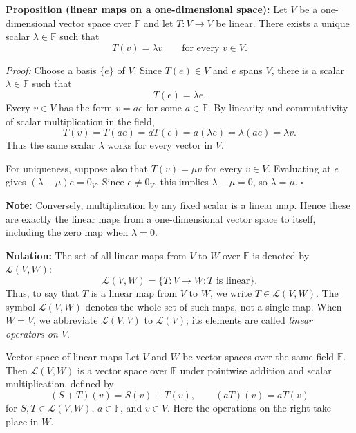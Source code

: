 \documentclass[a4paper,11pt,abstract=true]{scrartcl}
\theoremstyle{dotlessP}
\theoremstyle{dotlessS}
\theoremstyle{remark}
\theoremstyle{definition}
\begin{document}
\begin{claim_box}
\textbf{Proposition (linear maps on a one-dimensional space):} Let
$V$ be a one-dimensional vector space over $\mathbb{F}$ and let
$T:V\longrightarrow V$ be linear. There exists a unique scalar
$\lambda\in\mathbb{F}$ such that
\[
T(v)=\lambda v\qquad\text{for every }v\in V.
\]

\textit{Proof:} Choose a basis $\{e\}$ of $V$. Since $T(e)\in V$ and
$e$ spans $V$, there is a scalar $\lambda\in\mathbb{F}$ such that
\[
T(e)=\lambda e.
\]
Every $v\in V$ has the form $v=ae$ for some $a\in\mathbb{F}$.
By linearity and commutativity of scalar multiplication in the field,
\[
T(v)=T(ae)=aT(e)=a(\lambda e)=\lambda(ae)=\lambda v.
\]
Thus the same scalar $\lambda$ works for every vector in $V$.

For uniqueness, suppose also that $T(v)=\mu v$ for every $v\in V$.
Evaluating at $e$ gives $(\lambda-\mu)e=0_V$. Since $e\neq0_V$,
this implies $\lambda-\mu=0$, so $\lambda=\mu$.
\hfill$\square$
\end{claim_box}

\begin{claim_box}
\textbf{Note:} Conversely, multiplication by any fixed scalar is
a linear map. Hence these are exactly the linear maps from a
one-dimensional vector space to itself, including the zero map when
$\lambda=0$.
\end{claim_box}

\begin{definition_box}
\textbf{Notation:} The set of all linear maps from $V$ to $W$ over
$\mathbb{F}$ is denoted by $\mathcal{L}(V,W)$:
\[
\mathcal{L}(V,W)=\{T:V\longrightarrow W:T\text{ is linear}\}.
\]
Thus, to say that $T$ is a linear map from $V$ to $W$, we write
$T\in\mathcal{L}(V,W)$. The symbol $\mathcal{L}(V,W)$ denotes the whole set
of such maps, not a single map. When $W=V$, we abbreviate
$\mathcal{L}(V,V)$ to $\mathcal{L}(V)$; its elements are called
\emph{linear operators on $V$}.
\end{definition_box}

\begin{mainbox}{Vector space of linear maps}
Let $V$ and $W$
be vector spaces over the same field $\mathbb{F}$. Then
$\mathcal{L}(V,W)$ is a vector space over $\mathbb{F}$ under pointwise
addition and scalar multiplication, defined by
\[
(S+T)(v)=S(v)+T(v),
\qquad (aT)(v)=aT(v)
\]
for $S,T\in\mathcal{L}(V,W)$, $a\in\mathbb{F}$, and $v\in V$.
Here the operations on the right take place in $W$.
\end{mainbox}
\end{document}
